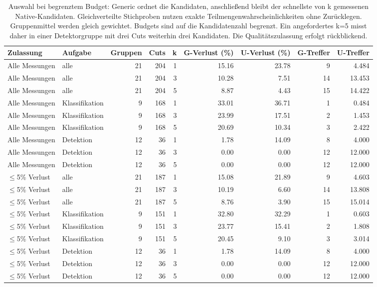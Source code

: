 \begin{table}[t]
\centering
\caption{Auswahl bei begrenztem Budget: Generic ordnet die Kandidaten, anschließend bleibt der schnellste von k gemessenen Native-Kandidaten. Gleichverteilte Stichproben nutzen exakte Teilmengenwahrscheinlichkeiten ohne Zurücklegen. Gruppenmittel werden gleich gewichtet. Budgets sind auf die Kandidatenzahl begrenzt. Ein angefordertes k=5 misst daher in einer Detektorgruppe mit drei Cuts weiterhin drei Kandidaten. Die Qualitätszulassung erfolgt rückblickend.}
\label{tab:budget-details}
\begingroup\small\setlength{\tabcolsep}{3pt}
\begin{tabular*}{\textwidth}{@{\extracolsep{\fill}}l l r r r r r r r@{}}
\toprule
Zulassung & Aufgabe & Gruppen & Cuts & k & G-Verlust (\%) & U-Verlust (\%) & G-Treffer & U-Treffer \\
\midrule
Alle Messungen & alle & 21 & 204 & 1 & 15.16 & 23.78 & 9 & 4.484 \\
Alle Messungen & alle & 21 & 204 & 3 & 10.28 & 7.51 & 14 & 13.453 \\
Alle Messungen & alle & 21 & 204 & 5 & 8.87 & 4.43 & 15 & 14.422 \\
Alle Messungen & Klassifikation & 9 & 168 & 1 & 33.01 & 36.71 & 1 & 0.484 \\
Alle Messungen & Klassifikation & 9 & 168 & 3 & 23.99 & 17.51 & 2 & 1.453 \\
Alle Messungen & Klassifikation & 9 & 168 & 5 & 20.69 & 10.34 & 3 & 2.422 \\
Alle Messungen & Detektion & 12 & 36 & 1 & 1.78 & 14.09 & 8 & 4.000 \\
Alle Messungen & Detektion & 12 & 36 & 3 & 0.00 & 0.00 & 12 & 12.000 \\
Alle Messungen & Detektion & 12 & 36 & 5 & 0.00 & 0.00 & 12 & 12.000 \\
$\leq$5\% Verlust & alle & 21 & 187 & 1 & 15.08 & 21.89 & 9 & 4.603 \\
$\leq$5\% Verlust & alle & 21 & 187 & 3 & 10.19 & 6.60 & 14 & 13.808 \\
$\leq$5\% Verlust & alle & 21 & 187 & 5 & 8.76 & 3.90 & 15 & 15.014 \\
$\leq$5\% Verlust & Klassifikation & 9 & 151 & 1 & 32.80 & 32.29 & 1 & 0.603 \\
$\leq$5\% Verlust & Klassifikation & 9 & 151 & 3 & 23.77 & 15.41 & 2 & 1.808 \\
$\leq$5\% Verlust & Klassifikation & 9 & 151 & 5 & 20.45 & 9.10 & 3 & 3.014 \\
$\leq$5\% Verlust & Detektion & 12 & 36 & 1 & 1.78 & 14.09 & 8 & 4.000 \\
$\leq$5\% Verlust & Detektion & 12 & 36 & 3 & 0.00 & 0.00 & 12 & 12.000 \\
$\leq$5\% Verlust & Detektion & 12 & 36 & 5 & 0.00 & 0.00 & 12 & 12.000 \\
\bottomrule
\end{tabular*}
\endgroup
\end{table}
